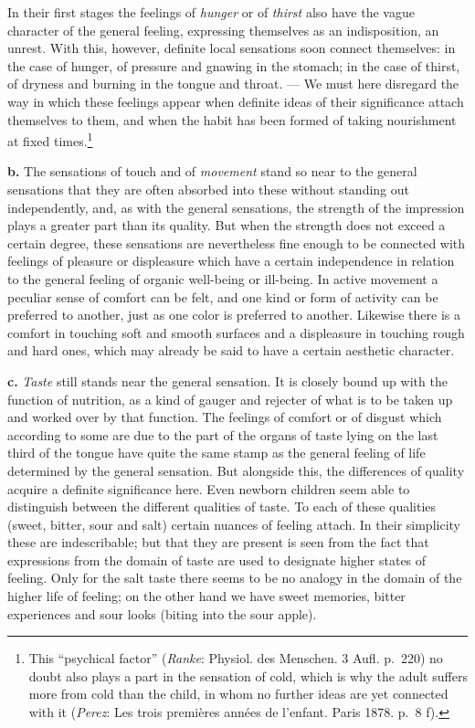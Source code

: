 \documentclass[12pt,a4paper]{book}
\newcommand{\opage}[1]{\marginnote{\footnotesize\textit{[#1]}}}
\begin{document}
In their first stages the feelings of \emph{hunger} or of \emph{thirst}
also have the vague character of the general feeling, expressing
themselves as an indisposition, an unrest. With this, however, definite
local sensations soon connect themselves: in the case of hunger, of
pressure and gnawing in the stomach; in the case of thirst, of dryness
and burning in the tongue and throat. --- We must here disregard the way
in which these feelings appear when definite
\opage{275}ideas of their significance attach themselves to them, and
when the habit has been formed of taking nourishment at fixed
times.\footnote{This ``psychical factor'' (\emph{Ranke}: Physiol. des
Menschen. 3 Aufl. p.~220) no doubt also plays a part in the sensation of
cold, which is why the adult suffers more from cold than the child, in
whom no further ideas are yet connected with it (\emph{Perez}: Les trois
premières années de l'enfant. Paris 1878. p.~8 f).}

\textbf{b.} The sensations of touch and of \emph{movement} stand so near
to the general sensations that they are often absorbed into these
without standing out independently, and, as with the general
sensations, the strength of the impression plays a greater part than its
quality. But when the strength does not exceed a certain degree, these
sensations are nevertheless fine enough to be connected with feelings of
pleasure or displeasure which have a certain independence in relation to
the general feeling of organic well-being or ill-being. In active
movement a peculiar sense of comfort can be felt, and one kind or form
of activity can be preferred to another, just as one color is preferred
to another. Likewise there is a comfort in touching soft and smooth
surfaces and a displeasure in touching rough and hard ones, which may
already be said to have a certain aesthetic character.

\textbf{c.} \emph{Taste} still stands near the general sensation. It is
closely bound up with the function of nutrition, as a kind of gauger and
rejecter of what is to be taken up and worked over by that function. The
feelings of comfort or of disgust which according to some are due to
the part of the organs of taste lying on the last third of the tongue
have quite the same stamp as the general feeling of life determined by
the general sensation. But alongside this, the differences of quality
acquire a definite significance here. Even newborn children seem able
to distinguish between the different qualities of taste. To each of
these qualities (sweet, bitter, sour and salt) certain nuances of
feeling attach. In their simplicity these are indescribable; but that
they are present is seen from the fact that expressions from the domain
of taste are used to designate higher states of feeling. Only for the
salt taste there seems to be no analogy in the domain of the
\opage{276}higher life of feeling; on the other hand we have sweet
memories, bitter experiences and sour looks (biting into the sour
apple).
\end{document}

